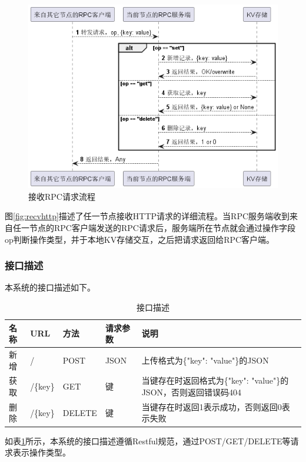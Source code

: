 \begin{figure}[H]
    \centering
    \includegraphics[width=0.8\linewidth]{examples/接收RPC流程.png}
    \caption{接收RPC请求流程}
    \label{fig:recvrpc}
\end{figure}

图\ref{fig:recvhttp}描述了任一节点接收HTTP请求的详细流程。当RPC服务端收到来自任一节点的RPC客户端发送的RPC请求后，服务端所在节点就会通过操作字段op判断操作类型，并于本地KV存储交互，之后把请求返回给RPC客户端。

\subsubsection{接口描述}

本系统的接口描述如下。

\begin{table}[H]
    \centering
    \caption{接口描述}
    \label{tab:api}
    {
        \begin{tabularx}{0.9\linewidth}{|p{1cm}|p{1.1cm}|p{1.6cm}|p{1.8cm}|X|}
            \hline
            名称 & URL & 方法 & 请求参数 & 说明 \\
            \hline 
            新增 & / & POST & JSON & 上传格式为\{"key": "value"\}\newline 的JSON \\
            获取 & /\{key\} & GET & 键 & 当键存在时返回格式为\{"key": "value"\}的JSON，否则返回错误码404 \\
            删除 & /\{key\} & DELETE & 键 & 当键存在时返回1表示成功，否则返回0表示失败 \\
            \hline
        \end{tabularx}
    }
\end{table}

如表\ref{tab:api}所示，本系统的接口描述遵循Restful规范，通过POST/GET/DELETE等请求表示操作类型。